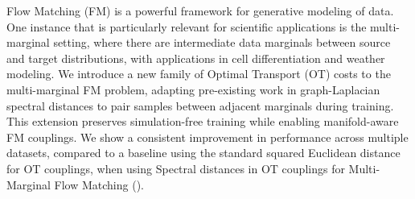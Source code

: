 Flow Matching (FM) is a powerful framework for generative modeling of data. One instance that is particularly relevant for scientific applications is the multi-marginal setting, where there are intermediate data marginals between source and target distributions, with applications in cell differentiation and weather modeling. We introduce a new family of Optimal Transport (OT) costs to the multi-marginal FM problem, adapting pre-existing work in graph-Laplacian spectral distances to pair samples between adjacent marginals during training. This extension preserves simulation-free training while enabling manifold-aware FM couplings. We show a consistent improvement in performance across multiple datasets, compared to a baseline using the standard squared Euclidean distance for OT couplings, when using Spectral distances in OT couplings for Multi-Marginal Flow Matching (\ourmodel).